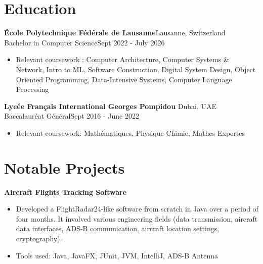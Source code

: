 \documentclass[a4paper, 10pt]{article}
\newenvironment{highlights}{
    \begin{itemize}[
        topsep=0.10 cm,
        parsep=0.10 cm,
        partopsep=0pt,
        itemsep=0pt,
        leftmargin=0.4 cm + 10pt
    ]
}{
    \end{itemize}
} %
\let\hrefWithoutArrow\href
\renewcommand{\href}[2]{\hrefWithoutArrow{#1}{\ifthenelse{\equal{#2}{}}{ }{#2 }\raisebox{.15ex}{\footnotesize \faExternalLink*}}}
\begin{document}
    \section{Education}
        \textbf{École Polytechnique Fédérale de Lausanne}\hfill Lausanne, Switzerland\\
        Bachelor in Computer Science\hfill Sept 2022 - July 2026
        \begin{highlights}
            \item Relevant coursework : Computer Architecture, Computer Systems \& Network, Intro to ML, Software Construction, Digital System Design, Object Oriented Programming, 
            Data-Intensive Systems, Computer Language Processing %
        \end{highlights}
        \textbf{Lycée Français International Georges Pompidou} \hfill Dubai, UAE\\
        Baccalauréat Général\hfill Sept 2016 - June 2022
        \begin{highlights}
            \item Relevant coursework: Mathématiques, Physique-Chimie, Mathes Expertes
        \end{highlights}
    
    \section{Notable Projects} 
        \textbf{Aircraft Flights Tracking Software}\href{https://github.com/relogamimano/Javions}{}
        \begin{highlights}
            \item Developed a FlightRadar24-like software from scratch in Java over a period of four months. It involved various
            engineering fields (data transmission, aircraft data interfaces, ADS-B communication, aircraft location settings, cryptography).
            \item Tools used: Java, JavaFX, JUnit, JVM, IntelliJ, ADS-B Antenna
        \end{highlights}
\end{document}
